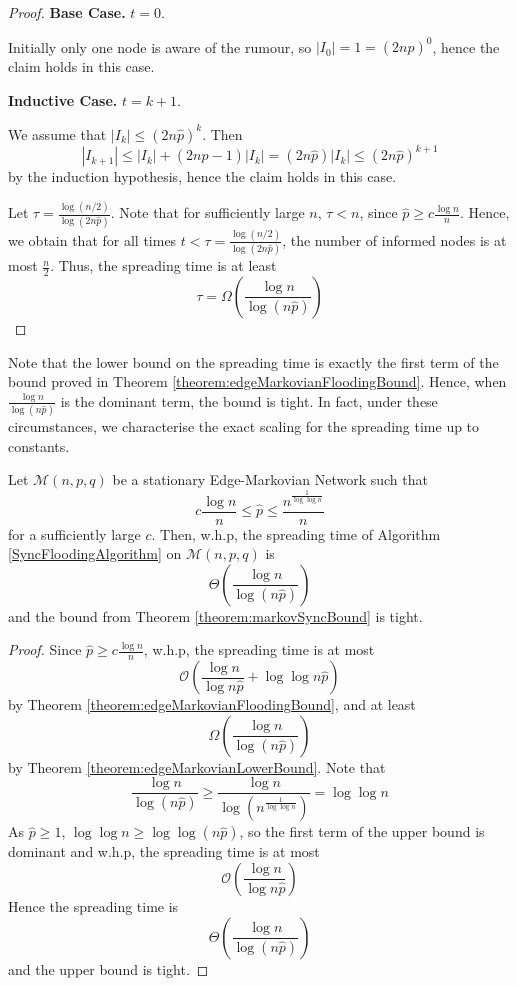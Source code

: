 \begin{proof}
	\textbf{Base Case.} $t=0$.

	Initially only one node is aware of the rumour, so $|I_0| = 1 = (2n\hat{p})^0$, hence the claim holds in this case.

	\textbf{Inductive Case.} $t=k+1$.

	We assume that $|I_k| \leq (2n\hat{p})^k$. Then 
	$$
		|I_{k+1}| \leq |I_k| + (2n\hat{p} - 1)|I_k| = (2n\hat{p})|I_k| \leq (2n\hat{p})^{k+1}
	$$
	by the induction hypothesis, hence the claim holds in this case.

	Let $\tau = \frac{\log (n/2)}{\log(2n\hat{p})}$. Note that for sufficiently large $n$, $\tau < n$, since $\hat{p} \geq c \frac{\log n}{n}$.
	Hence, we obtain that for all times $t < \tau = \frac{\log (n/2)}{\log(2n\hat{p})}$, the number of informed nodes is at most $\frac{n}{2}$. Thus, the spreading time is at least 
	$$
		\tau = \Omega\left(\frac{\log n}{\log(n \hat{p})}\right)
	$$
\end{proof}

Note that the lower bound on the spreading time is exactly the first term of the bound proved in Theorem \ref{theorem:edgeMarkovianFloodingBound}. Hence, when $\frac{\log n}{\log (n\hat{p})}$ is the dominant term, the bound is tight. In fact, under these circumstances, we characterise the exact scaling for the spreading time up to constants.

\begin{corollary}\label{corollary:edgeMarkovianThetaBound}
	Let $\mathcal{M}(n, p, q)$ be a stationary Edge-Markovian Network such that 
	$$
		c \frac{\log n}{n} \leq \hat{p} \leq  \frac{n^\frac{1}{\log \log n}}{n}
	$$
	for a sufficiently large $c$. Then, w.h.p, the spreading time of Algorithm \ref{SyncFloodingAlgorithm} on $\mathcal{M}(n, p , q)$ is 
	$$
		\Theta\left(\frac{\log n}{\log(n\hat{p})}\right)
	$$
	and the bound from Theorem \ref{theorem:markovSyncBound} is tight.
\end{corollary}

\begin{proof}
	Since $\hat{p} \geq c \frac{\log n}{n}$, w.h.p, the spreading time is at most 
	$$
		\mathcal{O}\left(\frac{\log n}{\log n\hat{p}} + \log \log n\hat{p} \right)
	$$ by Theorem \ref{theorem:edgeMarkovianFloodingBound}, and at least 
	$$
		\Omega\left(\frac{\log n}{\log(n \hat{p})}\right)
	$$
	by Theorem \ref{theorem:edgeMarkovianLowerBound}.
	Note that 
	$$
		\frac{\log n}{\log(n\hat{p})} \geq \frac{\log n}{\log(n^\frac{1}{\log \log n})} = \log \log n
	$$
	As $\hat{p} \geq 1$, $\log \log n \geq \log \log (n\hat{p})$, so the first term of the upper bound is dominant and w.h.p, the spreading time is at most 
	$$
		\mathcal{O}\left(\frac{\log n}{\log n\hat{p}}\right)
	$$
	Hence the spreading time is
	$$
		\Theta\left(\frac{\log n}{\log(n\hat{p})}\right)
	$$
	and the upper bound is tight.
\end{proof}

